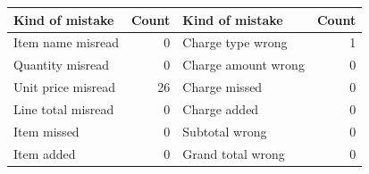 \begin{tabular}{@{}lrlr@{}}
\toprule
Kind of mistake & Count & Kind of mistake & Count \\
\midrule
Item name misread & 0 & Charge type wrong & 1 \\
Quantity misread & 0 & Charge amount wrong & 0 \\
Unit price misread & 26 & Charge missed & 0 \\
Line total misread & 0 & Charge added & 0 \\
Item missed & 0 & Subtotal wrong & 0 \\
Item added & 0 & Grand total wrong & 0 \\
\bottomrule
\end{tabular}
